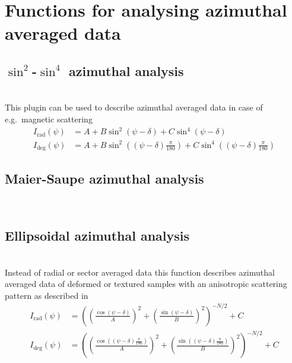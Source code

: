 \clearpage
\section{Functions for analysing azimuthal averaged data}



\subsection{$\sin^2$-$\sin^4$ azimuthal analysis} ~\\
This plugin can be used to describe azimuthal averaged data in case of e.g.\ magnetic scattering \cite{Wiedenmann2011}
\begin{align}
I_\mathrm{rad}(\psi) &= A + B\sin^2(\psi-\delta) + C \sin^4(\psi-\delta) \\
I_\mathrm{deg}(\psi) &= A + B\sin^2\left((\psi-\delta)\frac{\pi}{180}\right) + C \sin^4\left((\psi-\delta)\frac{\pi}{180}\right)
\end{align}

\subsection{Maier-Saupe azimuthal analysis} ~\\

\subsection{Ellipsoidal azimuthal analysis} ~\\ 
Instead of radial or sector averaged data this function describes azimuthal averaged data of deformed or textured samples with an anisotropic scattering pattern as described in
\cite{Summerfield1983,Mildner1983,Reynolds1984,Hammouda1986,Hammouda1986a,Saraf1989,Svetogorsky1990,Gu2016,Gu2018}
\begin{align}
I_\mathrm{rad}(\psi) &= \left(\left(\frac{\cos(\psi-\delta)}{A}\right)^2 + \left(\frac{\sin(\psi-\delta)}{B}\right)^2\right)^{-N/2} +C\\
I_\mathrm{deg}(\psi) &= \left(\left(\frac{\cos\left((\psi-\delta)\frac{\pi}{180}\right)}{A}\right)^2 + \left(\frac{\sin\left((\psi-\delta)\frac{\pi}{180}\right)}{B}\right)^2\right)^{-N/2}+C
\end{align}
